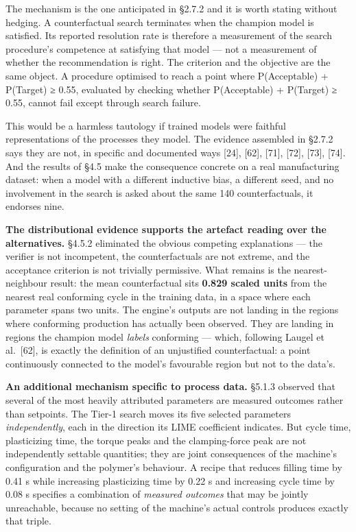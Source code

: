 The mechanism is the one anticipated in §2.7.2 and it is worth stating without hedging. A counterfactual search terminates when the champion model is satisfied. Its reported resolution rate is therefore a measurement of the search procedure's competence at satisfying that model --- not a measurement of whether the recommendation is right. The criterion and the objective are the same object. A procedure optimised to reach a point where P(Acceptable) + P(Target) ≥ 0.55, evaluated by checking whether P(Acceptable) + P(Target) ≥ 0.55, cannot fail except through search failure.

This would be a harmless tautology if trained models were faithful representations of the processes they model. The evidence assembled in §2.7.2 says they are not, in specific and documented ways {[}24{]}, {[}62{]}, {[}71{]}, {[}72{]}, {[}73{]}, {[}74{]}. And the results of §4.5 make the consequence concrete on a real manufacturing dataset: when a model with a different inductive bias, a different seed, and no involvement in the search is asked about the same 140 counterfactuals, it endorses nine.

\textbf{The distributional evidence supports the artefact reading over the alternatives.} §4.5.2 eliminated the obvious competing explanations --- the verifier is not incompetent, the counterfactuals are not extreme, and the acceptance criterion is not trivially permissive. What remains is the nearest-neighbour result: the mean counterfactual sits \textbf{0.829 scaled units} from the nearest real conforming cycle in the training data, in a space where each parameter spans two units. The engine's outputs are not landing in the regions where conforming production has actually been observed. They are landing in regions the champion model \emph{labels} conforming --- which, following Laugel et al.~{[}62{]}, is exactly the definition of an unjustified counterfactual: a point continuously connected to the model's favourable region but not to the data's.

\textbf{An additional mechanism specific to process data.} §5.1.3 observed that several of the most heavily attributed parameters are measured outcomes rather than setpoints. The Tier-1 search moves its five selected parameters \emph{independently}, each in the direction its LIME coefficient indicates. But cycle time, plasticizing time, the torque peaks and the clamping-force peak are not independently settable quantities; they are joint consequences of the machine's configuration and the polymer's behaviour. A recipe that reduces filling time by 0.41 s while increasing plasticizing time by 0.22 s and increasing cycle time by 0.08 s specifies a combination of \emph{measured outcomes} that may be jointly unreachable, because no setting of the machine's actual controls produces exactly that triple.

